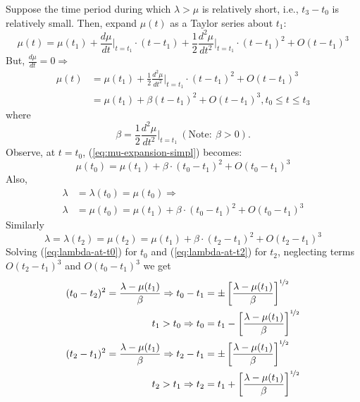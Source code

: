 \documentclass[12pt]{report}
\newcounter{time}
\begin{document}
Suppose the time period during which $\lambda > \mu$ is relatively short, i.e., $t_3 - t_0$ is relatively
small. Then, expand $\mu(t)$ as a Taylor series about $t_1$:
\begin{equation}
  \label{eq:mu-expansion}
  \mu(t) = \mu(t_1)+\frac{d\mu}{dt}\Biggr\rvert_{t=t_1} \cdot{}(t-t_1)
  +\frac{1}{2}\frac{d^2\mu}{dt^2}\Biggr\rvert_{t=t_1} \cdot{}(t-t_1)^2
  +O(t-t_1)^3
\end{equation}
But, $\frac{d\mu}{dt} = 0 \Rightarrow$
\begin{equation}
\begin{split}
  \label{eq:mu-expansion-simpl}
  \mu(t) & = \mu(t_1)+\frac{1}{2}\frac{d^2\mu}{dt^2}\Biggr\rvert_{t=t_1}\cdot(t-t_1)^2+O(t-t_1)^3 \\
  ~& = \mu(t_1)+\beta (t-t_1)^2 + O(t-t_1)^3, t_0 \le t \le t_3
\end{split}
\end{equation}
where
\begin{equation}
  \label{eq:beta}
  \beta = \frac{1}{2}\frac{d^2\mu}{dt^2}\Biggr\rvert_{t=t_1} \: (\mathrm{Note:}\: \beta > 0).
\end{equation}
Observe, at $t=t_0$, (\ref{eq:mu-expansion-simpl}) becomes:
\begin{equation}
  \label{eq:mu-at-t0}
  \mu(t_0) = \mu(t_1) + \beta \cdot (t_0-t_1)^2+O(t_0-t_1)^3
\end{equation}
Also, 
\begin{equation}
  \label{eq:lambda-at-t0}
\begin{split}
  \lambda & = \lambda(t_0) = \mu(t_0) \Rightarrow \\
  \lambda & = \mu(t_0) = \mu(t_1) + \beta \cdot
  (t_0-t_1)^2+O(t_0-t_1)^3
\end{split}
\end{equation}
Similarly
\begin{equation}
  \label{eq:lambda-at-t2}
  \lambda = \lambda(t_2) = \mu(t_2) = \mu(t_1) + \beta \cdot (t_2-t_1)^2+O(t_2-t_1)^3
\end{equation}
Solving (\ref{eq:lambda-at-t0}) for $t_0$ and (\ref{eq:lambda-at-t2})
for $t_2$, neglecting terms $O(t_2 - t_1)^3$ and $O(t_0 - t_1 )^3$ we get
\begin{equation}
  \label{eq:t1-t2-implications}
  \begin{split}
    (t_0-t_2)^2 = \frac{\lambda-\mu(t_1)}{\beta} \Rightarrow t_0-t_1 & = \pm\left[\frac{\lambda-\mu(t_1)}{\beta}\right]^{\nicefrac{1}{2}}\\
    t_1>t_0 \Rightarrow t_0 & = t_1 - \left[\frac{\lambda-\mu(t_1)}{\beta}\right]^{\nicefrac{1}{2}}\\
    (t_2-t_1)^2 = \frac{\lambda-\mu(t_1)}{\beta} \Rightarrow t_2 - t_1 & = \pm\left[\frac{\lambda-\mu(t_1)}{\beta}\right]^{\nicefrac{1}{2}}\\
    t_2>t_1 \Rightarrow t_2 & = t_1  + \left[\frac{\lambda-\mu(t_1)}{\beta}\right]^{\nicefrac{1}{2}}
  \end{split}
\end{equation}
\end{document}
